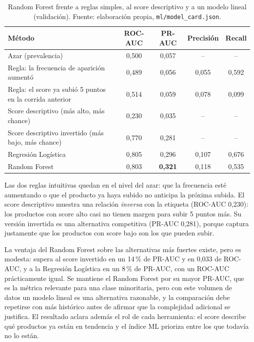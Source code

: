 \begin{table}[H]
	\centering
	\small
	\caption{Random Forest frente a reglas simples, al score descriptivo y a un modelo lineal (validación). Fuente: elaboración propia, \texttt{ml/model\_card.json}.}
	\label{tab:ml-baselines}
	\begin{tabularx}{\textwidth}{@{}X cccc@{}}
		\toprule
		\textbf{Método} & \textbf{ROC-AUC} & \textbf{PR-AUC} & \textbf{Precisión} & \textbf{Recall} \\
		\midrule
		Azar (prevalencia) & 0,500 & 0,057 & -- & -- \\
		Regla: la frecuencia de aparición aumentó & 0,489 & 0,056 & 0,055 & 0,592 \\
		Regla: el score ya subió 5 puntos en la corrida anterior & 0,514 & 0,059 & 0,078 & 0,099 \\
		Score descriptivo (más alto, más chance) & 0,230 & 0,035 & -- & -- \\
		Score descriptivo invertido (más bajo, más chance) & 0,770 & 0,281 & -- & -- \\
		Regresión Logística & 0,805 & 0,296 & 0,107 & 0,676 \\
		Random Forest & 0,803 & \textbf{0,321} & 0,118 & 0,535 \\
		\bottomrule
	\end{tabularx}
\end{table}

Las dos reglas intuitivas quedan en el nivel del azar: que la frecuencia esté aumentando o que el producto ya haya subido no anticipa la próxima subida. El score descriptivo muestra una relación \emph{inversa} con la etiqueta (ROC-AUC 0,230): los productos con score alto casi no tienen margen para subir 5 puntos más. Su versión invertida es una alternativa competitiva (PR-AUC 0,281), porque captura justamente que los productos con score bajo son los que pueden subir.

La ventaja del Random Forest sobre las alternativas más fuertes existe, pero es modesta: supera al score invertido en un 14\,\% de PR-AUC y en 0,033 de ROC-AUC, y a la Regresión Logística en un 8\,\% de PR-AUC, con un ROC-AUC prácticamente igual. Se mantiene el Random Forest por su mayor PR-AUC, que es la métrica relevante para una clase minoritaria, pero con este volumen de datos un modelo lineal es una alternativa razonable, y la comparación debe repetirse con más histórico antes de afirmar que la complejidad adicional se justifica. El resultado aclara además el rol de cada herramienta: el score describe qué productos ya están en tendencia y el índice ML prioriza entre los que todavía no lo están.


